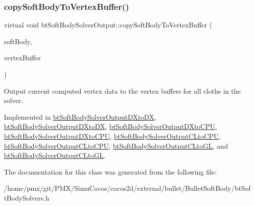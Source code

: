 \subsubsection{\texorpdfstring{copy\+Soft\+Body\+To\+Vertex\+Buffer()}{copySoftBodyToVertexBuffer()}}
{\footnotesize\ttfamily virtual void bt\+Soft\+Body\+Solver\+Output\+::copy\+Soft\+Body\+To\+Vertex\+Buffer (\begin{DoxyParamCaption}\item[{const \hyperlink{classbtSoftBody}{bt\+Soft\+Body} $\ast$const}]{soft\+Body,  }\item[{\hyperlink{classbtVertexBufferDescriptor}{bt\+Vertex\+Buffer\+Descriptor} $\ast$}]{vertex\+Buffer }\end{DoxyParamCaption})\hspace{0.3cm}{\ttfamily [pure virtual]}}

Output current computed vertex data to the vertex buffers for all cloths in the solver. 

Implemented in \hyperlink{classbtSoftBodySolverOutputDXtoDX_ab1bb3e5dd8a6e45ad6063398682806cb}{bt\+Soft\+Body\+Solver\+Output\+D\+Xto\+DX}, \hyperlink{classbtSoftBodySolverOutputDXtoDX_aac21bd05d5f1a2afb9ee855554ac13f1}{bt\+Soft\+Body\+Solver\+Output\+D\+Xto\+DX}, \hyperlink{classbtSoftBodySolverOutputDXtoCPU_a0106bf90eec43326254607cab4a10478}{bt\+Soft\+Body\+Solver\+Output\+D\+Xto\+C\+PU}, \hyperlink{classbtSoftBodySolverOutputDXtoCPU_abd837007ef454a8363e73ced3abf1f09}{bt\+Soft\+Body\+Solver\+Output\+D\+Xto\+C\+PU}, \hyperlink{classbtSoftBodySolverOutputCLtoCPU_a2ab37dd740cd08217468e4b9e74d73f5}{bt\+Soft\+Body\+Solver\+Output\+C\+Lto\+C\+PU}, \hyperlink{classbtSoftBodySolverOutputCLtoCPU_a0bffbe9f32160155ff56e90a0d8f547b}{bt\+Soft\+Body\+Solver\+Output\+C\+Lto\+C\+PU}, \hyperlink{classbtSoftBodySolverOutputCLtoGL_ab6f232898b815166551373a6c2d95b58}{bt\+Soft\+Body\+Solver\+Output\+C\+Lto\+GL}, and \hyperlink{classbtSoftBodySolverOutputCLtoGL_a4e5b99808b1072064295810529c7755a}{bt\+Soft\+Body\+Solver\+Output\+C\+Lto\+GL}.



The documentation for this class was generated from the following file\+:\begin{DoxyCompactItemize}
\item 
/home/pmx/git/\+P\+M\+X/\+Simu\+Cocos/cocos2d/external/bullet/\+Bullet\+Soft\+Body/bt\+Soft\+Body\+Solvers.\+h\end{DoxyCompactItemize}
